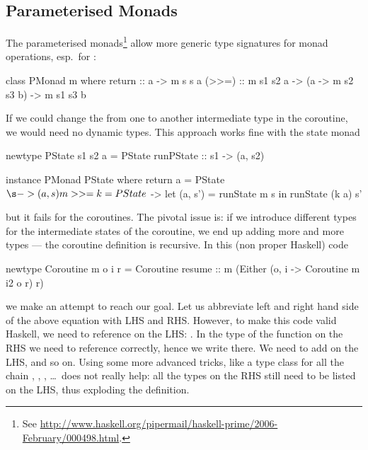 \subsection{Parameterised Monads}
The parameterised monads\footnote{See \url{http://www.haskell.org/pipermail/haskell-prime/2006-February/000498.html}.}  allow more generic type signatures for monad operations, esp.\ for \hs{>>=}\xspace\nolinebreak[4] \cite{monad-parametrisable}:
\begin{code}
class PMonad m where
return :: a -> m s s a
(>>=)  :: m s1 s2 a -> (a -> m s2 s3 b) -> m s1 s3 b
\end{code}
If we could change the from one to another intermediate type in the coroutine, we would need no dynamic types.
This approach works fine with the state monad
\begin{code}
newtype PState s1 s2 a
  = PState { runPState :: s1 -> (a, s2) }

instance PMonad PState where
return a  = PState $ \s -> (a, s)
m >>= k   = PState $ \s ->
              let (a, s') = runState m s
              in  runState (k a) s'
\end{code}
but it fails for the coroutines.
The pivotal issue is: if we introduce different types for the intermediate states of the coroutine, we end up adding more and more types --- the coroutine definition is recursive.
In this (non proper Haskell) code
\begin{code}
newtype Coroutine m o i r
  = Coroutine { resume :: m (Either (o, i
     -> Coroutine m i2 o r)  r) }
\end{code}
we make an attempt to reach our goal.
Let us abbreviate left and right hand side of the above equation with LHS and RHS.
However, to make this code valid Haskell, we need to reference  on the LHS: .
In the type of the  function on the RHS we need to reference  correctly, hence we write  there.
We need to add  on the LHS, and so on.
Using some more advanced tricks, like a type class for all the chain , , , \dots\ does not really help: all the types on the RHS still need to be listed on the LHS, thus exploding the definition.

%


